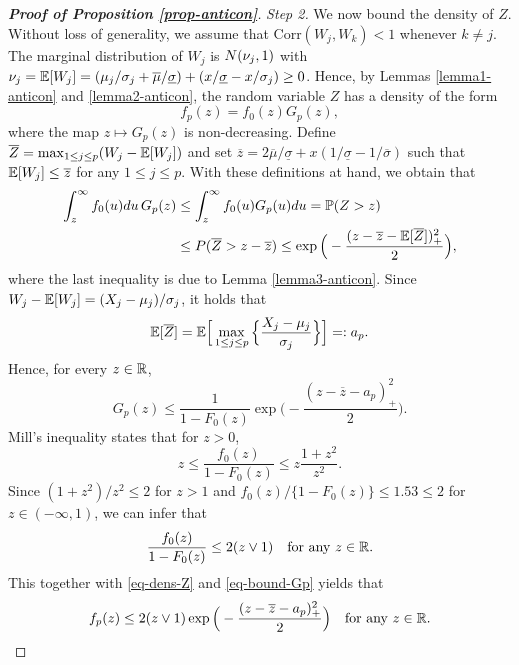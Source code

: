 \documentclass[a4paper,12pt]{article}
\numberwithin{equation}{section}
\begin{document}
\begin{proof}[\textnormal{\textbf{Proof of Proposition \ref{prop-anticon}}}]
\textit{Step 2.} We now bound the density of $Z$. Without loss of generality, we assume that $\text{Corr}(W_j,W_k) < 1$ whenever $k \ne j$. The marginal distribution of $W_j$ is $N(\nu_j,1)$ with $\nu_j = \mathbb{E}[W_j] = (\mu_j/\sigma_j + \overline{\mu}/{\underline{\sigma}}) + (x/\underline{\sigma} - x/\sigma_j) \ge 0$. Hence, by Lemmas \ref{lemma1-anticon} and \ref{lemma2-anticon}, the random variable $Z$ has a density of the form
\begin{equation}\label{eq-dens-Z}
f_p(z) = f_0(z) G_p(z), 
\end{equation}
where the map $z \mapsto G_p(z)$ is non-decreasing. Define $\overline{Z} = \max_{1 \le j \le p} (W_j - \mathbb{E}[W_j])$ and set $\overline{z} = 2 \overline{\mu}/\underline{\sigma} + x(1/\underline{\sigma} - 1/\overline{\sigma})$ such that $\mathbb{E}[W_j] \le \overline{z}$ for any $1 \le j \le p$. With these definitions at hand, we obtain that  
\begin{align*}
\int_z^{\infty} f_0(u)du \, G_p(z) & \le \int_z^{\infty} f_0(u) G_p(u) du = \mathbb{P}(Z > z) \\ 
 & \le P(\overline{Z} > z - \overline{z}) \le \exp \Big( - \frac{(z - \overline{z} - \mathbb{E}[\overline{Z}])^2_+}{2} \Big), 
\end{align*}
where the last inequality is due to Lemma \ref{lemma3-anticon}. Since $W_j - \mathbb{E}[W_j] = (X_j - \mu_j)/\sigma_j$, it holds that 
\[ \mathbb{E}[\overline{Z}] = \mathbb{E} \Big[ \max_{1 \le j \le p} \Big\{ \frac{X_j-\mu_j}{\sigma_j} \Big\} \Big] =: a_p. \]
Hence, for every $z \in \mathbb{R}$, 
\begin{equation}\label{eq-bound-Gp}
G_p(z) \le \frac{1}{1 - F_0(z)} \exp\Big( - \frac{(z - \overline{z} - a_p)_+^2}{2} \Big). 
\end{equation}
Mill's inequality states that for $z > 0$, 
\[ z \le \frac{f_0(z)}{1-F_0(z)} \le z \frac{1+z^2}{z^2}. \]
Since $(1+z^2)/z^2 \le 2$ for $z > 1$ and $f_0(z)/\{1-F_0(z)\} \le 1.53 \le 2$ for $z \in (-\infty,1)$, we can infer that
\[ \frac{f_0(z)}{1-F_0(z)} \le 2 (z \vee 1) \quad \text{for any } z \in \mathbb{R}. \]
This together with \eqref{eq-dens-Z} and \eqref{eq-bound-Gp} yields that
\[ f_p(z) \le 2 (z \vee 1)  \exp\Big( - \frac{(z - \overline{z} - a_p)_+^2}{2} \Big) \quad \text{for any } z \in \mathbb{R}. \]
\vspace{1pt}
 


\end{proof}
\end{document}
